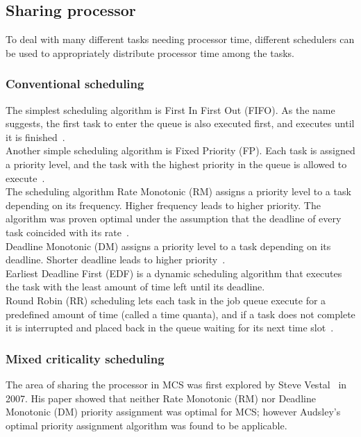 \subsection{Sharing processor}
To deal with many different tasks needing processor time, different schedulers can be used to appropriately distribute processor time among the tasks.

\subsubsection{Conventional scheduling}
The simplest scheduling algorithm is First In First Out (FIFO). As the name suggests, the first task to enter the queue is also executed first, and executes until it is finished~\cite{remzi2015}.\\

Another simple scheduling algorithm is Fixed Priority (FP). Each task is assigned a priority level, and the task with the highest priority in the queue is allowed to execute~\cite{liulayland1973}.\\

The scheduling algorithm Rate Monotonic (RM) assigns a priority level to a task depending on its frequency. Higher frequency leads to higher priority. The algorithm was proven optimal under the assumption that the deadline of every task coincided with its rate~\cite{liulayland1973}.\\

Deadline Monotonic (DM) assigns a priority level to a task depending on its deadline. Shorter deadline leads to higher priority~\cite{liulayland1973}.\\

Earliest Deadline First (EDF) is a dynamic scheduling algorithm that executes the task with the least amount of time left until its deadline.\\

Round Robin (RR) scheduling lets each task in the job queue execute for a predefined amount of time (called a time quanta), and if a task does not complete it is interrupted and placed back in the queue waiting for its next time slot~\cite{kleinrock1964}.

\subsubsection{Mixed criticality scheduling}
The area of sharing the processor in MCS was first explored by Steve Vestal~\cite{vestal2007} in 2007. His paper showed that neither Rate Monotonic (RM) nor Deadline Monotonic (DM) priority assignment was optimal for MCS; however Audsley’s optimal priority assignment algorithm \cite{audsley2001} was found to be applicable.\\ %

